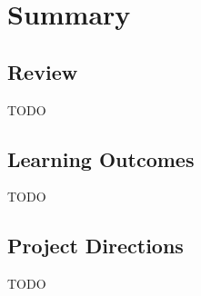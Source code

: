 \section{Summary}
	\subsection{Review}
	TODO

	\subsection{Learning Outcomes}
	TODO
	
	\subsection{Project Directions}
	TODO
	
